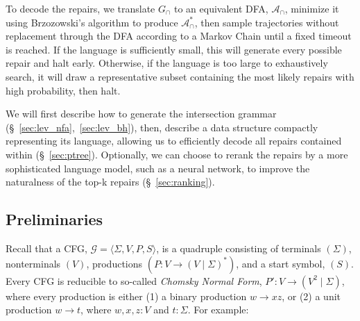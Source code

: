 \documentclass[sigplan,review,acmsmall,nonacm,anonymous]{acmart}\settopmatter{printfolios=false,printccs=false,printacmref=false}
\begin{document}

  To decode the repairs, we translate $G_\cap$ to an equivalent DFA, $\mathcal{A}_\cap$, minimize it using Brzozowski's algorithm to produce $\mathcal{A}_\cap^*$, then sample trajectories without replacement through the DFA according to a Markov Chain until a fixed timeout is reached. If the language is sufficiently small, this will generate every possible repair and halt early. Otherwise, if the language is too large to exhaustively search, it will draw a representative subset containing the most likely repairs with high probability, then halt.

  We will first describe how to generate the intersection grammar (\S~\ref{sec:lev_nfa},~\ref{sec:lev_bh}), then, describe a data structure compactly representing its language, allowing us to efficiently decode all repairs contained within (\S~\ref{sec:ptree}). Optionally, we can choose to rerank the repairs by a more sophisticated language model, such as a neural network, to improve the naturalness of the top-k repairs (\S~\ref{sec:ranking}).

  \subsection{Preliminaries}\label{sec:prelim}

  Recall that a CFG, $\mathcal{G} = \langle \Sigma, V, P, S\rangle$, is a quadruple consisting of terminals $(\Sigma)$, nonterminals $(V)$, productions $(P\colon V \rightarrow (V \mid \Sigma)^*)$, and a start symbol, $(S)$. Every CFG is reducible to so-called \textit{Chomsky Normal Form}, $P'\colon V \rightarrow (V^2 \mid \Sigma)$, where every production is either (1) a binary production $w \rightarrow xz$, or (2) a unit production $w \rightarrow t$, where $w, x, z: V$ and $t: \Sigma$. For example:\vspace{-3pt}
\end{document}
